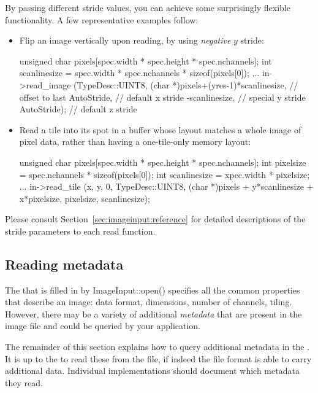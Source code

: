 By passing different stride values, you can achieve some surprisingly
flexible functionality.  A few representative examples follow:

\begin{itemize}
\item Flip an image vertically upon reading, by using \emph{negative}
  $y$ stride:
  \begin{code}
        unsigned char pixels[spec.width * spec.height * spec.nchannels];
        int scanlinesize = spec.width * spec.nchannels * sizeof(pixels[0]);
        ...
        in->read_image (TypeDesc::UINT8,
                        (char *)pixels+(yres-1)*scanlinesize, // offset to last
                        AutoStride,                  // default x stride
                        -scanlinesize,               // special y stride
                        AutoStride);                 // default z stride
  \end{code}
\item Read a tile into its spot in a buffer whose layout matches
  a whole image of pixel data,
  rather than having a one-tile-only memory layout:
  \begin{code}
        unsigned char pixels[spec.width * spec.height * spec.nchannels];
        int pixelsize = spec.nchannels * sizeof(pixels[0]);
        int scanlinesize = xpec.width * pixelsize;
        ...
        in->read_tile (x, y, 0, TypeDesc::UINT8,
                       (char *)pixels + y*scanlinesize + x*pixelsize,
                       pixelsize,
                       scanlinesize);
  \end{code}
\end{itemize}

Please consult Section~\ref{sec:imageinput:reference} for detailed
descriptions of the stride parameters to each {\cf read} function.


\subsection{Reading metadata}
\label{sec:imageinput:metadata}

The \ImageSpec that is filled in by {\cf ImageInput::open()}
specifies all the common properties that describe an image: data format,
dimensions, number of channels, tiling.  However, there may be a variety
of additional \emph{metadata} that are present in the image file and
could be queried by your application.

The remainder of this section explains how to query additional metadata
in the \ImageSpec.  It is up to the \ImageInput to read these
from the file, if indeed the file format is able to carry additional
data.  Individual \ImageInput implementations should document which
metadata they read.

